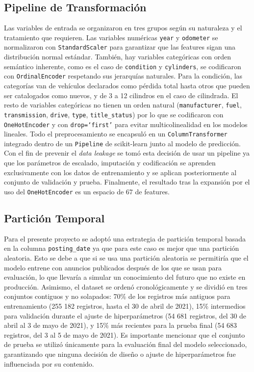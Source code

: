 \documentclass[conference]{IEEEtran}
\begin{document}
\subsection{Pipeline de Transformación}
\label{subsec:pipeline}
Las variables de entrada se organizaron en tres grupos según su naturaleza y el tratamiento que requieren. Las variables numéricas \texttt{year} y \texttt{odometer} se normalizaron con \texttt{StandardScaler} para garantizar que las features sigan una distribución normal estándar. También, hay variables categóricas con orden semántico inherente, como es el caso de \texttt{condition} y \texttt{cylinders}, se codificaron con \texttt{OrdinalEncoder} respetando sus jerarquías naturales. Para la condición, las categorías van de vehículos declarados como pérdida total hasta otros que pueden ser catalogados como nuevos, y de 3 a 12 cilindros en el caso de cilindrada. El resto de variables categóricas no tienen un orden natural (\texttt{manufacturer}, \texttt{fuel}, \texttt{transmission}, \texttt{drive}, \texttt{type}, \texttt{title\_status}) por lo que se codificaron con \texttt{OneHotEncoder} y con \texttt{drop=`first'} para evitar multicolinealidad en los modelos lineales. Todo el preprocesamiento se encapsuló en un \texttt{ColumnTransformer} integrado dentro de un \texttt{Pipeline} de scikit-learn junto al modelo de predicción. Con el fin de prevenir el \textit{data leakage} se tomó esta decisión de usar un pipeline ya que los parámetros de escalado, imputación y codificación se aprenden exclusivamente con los datos de entrenamiento y se aplican posteriormente al conjunto de validación y prueba. Finalmente, el resultado tras la expansión por el uso del \texttt{OneHotEncoder} es un espacio de 67 de features.

\subsection{Partición Temporal}
\label{subsec:particion}
Para el presente proyecto se adoptó una estrategia de partición temporal basada en la columna \texttt{posting\_date} ya que para este caso es mejor que una partición aleatoria. Esto se debe a que si se usa una partición aleatoria se permitiría que el modelo entrene con anuncios publicados después de los que se usan para evaluación, lo que llevaría a simular un conocimiento del futuro que no existe en producción. Asimismo, el dataset se ordenó cronológicamente y se dividió en tres conjuntos contiguos y no solapados: 70\% de los registros más antiguos para entrenamiento (255 182 registros, hasta el 30 de abril de 2021), 15\% intermedios para validación durante el ajuste de hiperparámetros (54 681 registros, del 30 de abril al 3 de mayo de 2021), y 15\% más recientes para la prueba final (54 683 registros, del 3 al 5 de mayo de 2021). Es importante mencionar que el conjunto de prueba se utilizó únicamente para la evaluación final del modelo seleccionado, garantizando que ninguna decisión de diseño o ajuste de hiperparámetros fue influenciada por su contenido. 
\end{document}
